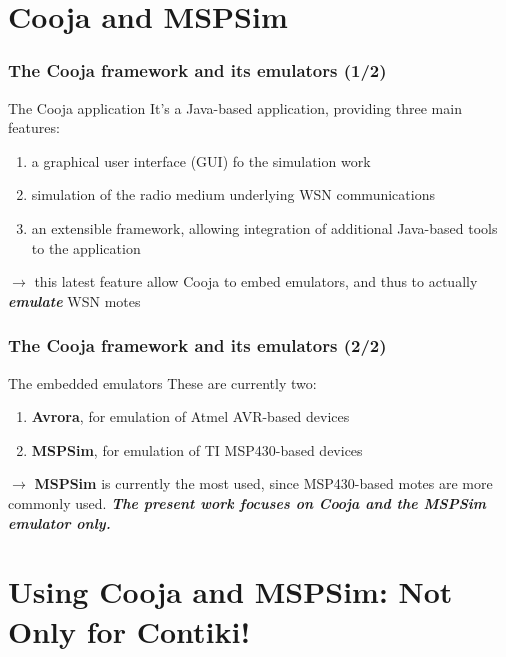\documentclass[10pt,c]{beamer}
\renewcommand{\emph}[1]{\textbf{\textit{#1}}}
\newcommand{\nom}[1]{\textbf{#1}}
\begin{document}

\section{Cooja and MSPSim}

\begin{frame}
\frametitle{The Cooja framework and its emulators (1/2)}
\begin{block}{The Cooja application}
It's a Java-based application, providing three main features:
\begin{enumerate}
\item a graphical user interface (GUI) fo the simulation work
\item simulation of the radio medium underlying WSN communications
\item an extensible framework, allowing integration of additional
Java-based tools to the application
\end{enumerate}
$\rightarrow$ this latest feature allow Cooja to embed emulators,
and thus to actually \emph{emulate} WSN motes
\end{block}
\end{frame}

\begin{frame}
\frametitle{The Cooja framework and its emulators (2/2)}
\begin{exampleblock}{The embedded emulators}
These are currently two:
\begin{enumerate}
\item \nom{Avrora}, for emulation of Atmel AVR-based devices
\item \nom{MSPSim}, for emulation of TI MSP430-based devices
\end{enumerate}
$\rightarrow$ \nom{MSPSim} is currently the most used, since
MSP430-based motes are more commonly used. \emph{The present work
focuses on Cooja and the MSPSim emulator only.}
\end{exampleblock}
\end{frame}


\section{Using Cooja and MSPSim: Not Only for Contiki!}
\end{document}
